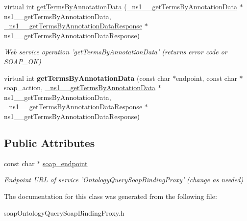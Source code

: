 \begin{DoxyCompactItemize}
\item 
\hypertarget{classOntologyQuerySoapBindingProxy_a7af6cc7e4b4caa86b0bd995afa5bd052}{
virtual int \hyperlink{classOntologyQuerySoapBindingProxy_a7af6cc7e4b4caa86b0bd995afa5bd052}{getTermsByAnnotationData} (\hyperlink{class__ns1____getTermsByAnnotationData}{\_\-ns1\_\-\_\-getTermsByAnnotationData} $\ast$ns1\_\-\_\-getTermsByAnnotationData, \hyperlink{class__ns1____getTermsByAnnotationDataResponse}{\_\-ns1\_\-\_\-getTermsByAnnotationDataResponse} $\ast$ns1\_\-\_\-getTermsByAnnotationDataResponse)}
\label{classOntologyQuerySoapBindingProxy_a7af6cc7e4b4caa86b0bd995afa5bd052}

\begin{DoxyCompactList}\small\item\em Web service operation 'getTermsByAnnotationData' (returns error code or SOAP\_\-OK) \end{DoxyCompactList}\item 
\hypertarget{classOntologyQuerySoapBindingProxy_a382b91e5529e146e4cd091610a5f2046}{
virtual int {\bfseries getTermsByAnnotationData} (const char $\ast$endpoint, const char $\ast$soap\_\-action, \hyperlink{class__ns1____getTermsByAnnotationData}{\_\-ns1\_\-\_\-getTermsByAnnotationData} $\ast$ns1\_\-\_\-getTermsByAnnotationData, \hyperlink{class__ns1____getTermsByAnnotationDataResponse}{\_\-ns1\_\-\_\-getTermsByAnnotationDataResponse} $\ast$ns1\_\-\_\-getTermsByAnnotationDataResponse)}
\label{classOntologyQuerySoapBindingProxy_a382b91e5529e146e4cd091610a5f2046}

\end{DoxyCompactItemize}
\subsection*{Public Attributes}
\begin{DoxyCompactItemize}
\item 
\hypertarget{classOntologyQuerySoapBindingProxy_a81dae83b9cc51ccd6d59390a0f3557ee}{
const char $\ast$ \hyperlink{classOntologyQuerySoapBindingProxy_a81dae83b9cc51ccd6d59390a0f3557ee}{soap\_\-endpoint}}
\label{classOntologyQuerySoapBindingProxy_a81dae83b9cc51ccd6d59390a0f3557ee}

\begin{DoxyCompactList}\small\item\em Endpoint URL of service 'OntologyQuerySoapBindingProxy' (change as needed) \end{DoxyCompactList}\end{DoxyCompactItemize}


The documentation for this class was generated from the following file:\begin{DoxyCompactItemize}
\item 
soapOntologyQuerySoapBindingProxy.h\end{DoxyCompactItemize}
